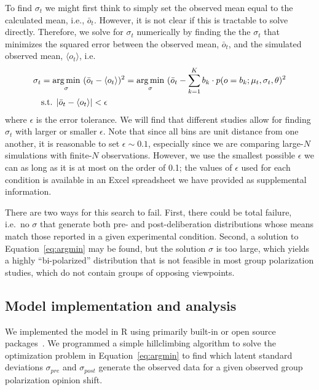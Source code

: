 To find $\sigma_t$ we might first think to simply set the observed mean
equal to the calculated mean, i.e., $\bar{o}_t$. However, it is not clear if
this is tractable to solve directly.
Therefore, we solve for $\sigma_{t}$ numerically by finding the 
the $\sigma_t$ that minimizes 
the squared error between the observed mean, $\bar{o}_t$, and the
simulated observed mean, $\langle o_t \rangle$, i.e.
\begin{equation}
  \begin{aligned}
     \sigma_t & = \operatorname*{arg\,min}_{\sigma}~(\bar{o}_t   - \langle o_t \rangle)^2 
        = \operatorname*{arg\,min}_{\sigma}~(\bar{o}_t   - \sum_{k=1}^K b_k \cdot p(o = b_k ; \mu_t, \sigma_t, \theta)^2  \\
       & \text{s.t. } |\bar{o}_t - \langle o_t \rangle| < \epsilon 
  \end{aligned}
    \label{eq:argmin}
\end{equation}
\noindent
where $\epsilon$ is the error tolerance. We will find that different studies
allow for finding $\sigma_t$ with larger or smaller $\epsilon$. Note that since 
all bins are unit distance from one another, it is reasonable to set 
$\epsilon \sim 0.1$, especially since we are comparing large-$N$ simulations
with finite-$N$ observations. However, we use the smallest possible
$\epsilon$ we can as long as it is at most on the order of 0.1; the values of
$\epsilon$ used for each condition is available in an Excel spreadsheet
we have provided as supplemental information.  

There are two ways for this search to fail. First, there could be total
failure, i.e.\ no
$\sigma$ that generate both pre- and post-deliberation 
distributions whose means match those reported in a given experimental 
condition. Second, a solution to Equation~\ref{eq:argmin} may be found, 
but the solution $\sigma$ is too large, which yields a highly ``bi-polarized''
distribution that is not feasible in most group polarization studies,
which do not contain groups of opposing viewpoints.


\subsection{Model implementation and analysis}

We implemented the model in R using primarily built-in or open source
packages~\cite{RLang}. We programmed a simple hillclimbing algorithm
to solve the optimization problem in Equation~\ref{eq:argmin} to find 
which latent standard deviations $\sigma_{pre}$ and $\sigma_{post}$
generate the observed data for a given observed group polarization
opinion shift.

